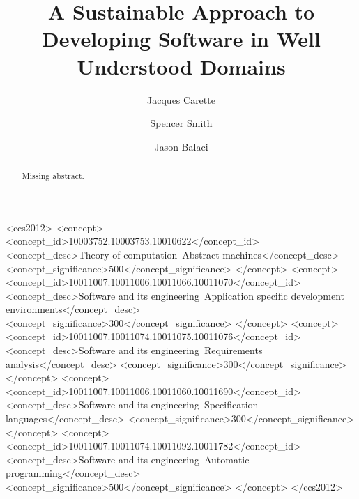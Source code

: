 \documentclass[sigconf,review]{acmart}
\begin{document}
\title{A Sustainable Approach to Developing Software in Well Understood Domains}

\author{Jacques Carette}

\author{Spencer Smith}

\author{Jason Balaci}

\begin{abstract}
  Missing abstract. %
\end{abstract}


\begin{CCSXML}
<ccs2012>
   <concept>
       <concept_id>10003752.10003753.10010622</concept_id>
       <concept_desc>Theory of computation~Abstract machines</concept_desc>
       <concept_significance>500</concept_significance>
       </concept>
   <concept>
       <concept_id>10011007.10011006.10011066.10011070</concept_id>
       <concept_desc>Software and its engineering~Application specific development environments</concept_desc>
       <concept_significance>300</concept_significance>
       </concept>
   <concept>
       <concept_id>10011007.10011074.10011075.10011076</concept_id>
       <concept_desc>Software and its engineering~Requirements analysis</concept_desc>
       <concept_significance>300</concept_significance>
       </concept>
   <concept>
       <concept_id>10011007.10011006.10011060.10011690</concept_id>
       <concept_desc>Software and its engineering~Specification languages</concept_desc>
       <concept_significance>300</concept_significance>
       </concept>
   <concept>
       <concept_id>10011007.10011074.10011092.10011782</concept_id>
       <concept_desc>Software and its engineering~Automatic programming</concept_desc>
       <concept_significance>500</concept_significance>
       </concept>
 </ccs2012>
\end{CCSXML}
\end{document}
